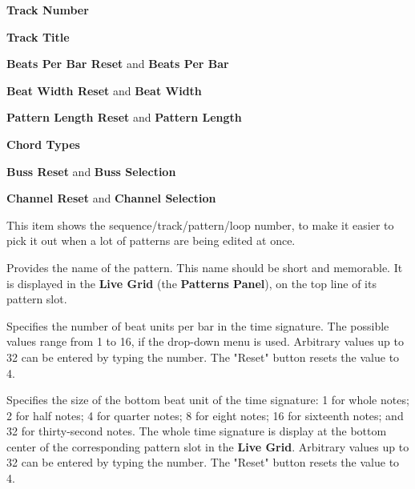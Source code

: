 
   \begin{enumber}
      \item \textbf{Track Number}
      \item \textbf{Track Title}
      \item \textbf{Beats Per Bar Reset} and \textbf{Beats Per Bar}
      \item \textbf{Beat Width Reset} and \textbf{Beat Width}
      \item \textbf{Pattern Length Reset} and \textbf{Pattern Length}
      \item \textbf{Chord Types}
      \item \textbf{Buss Reset} and \textbf{Buss Selection}
      \item \textbf{Channel Reset} and \textbf{Channel Selection}
   \end{enumber}

   \setcounter{ItemCounter}{0}      %

   This item shows the sequence/track/pattern/loop
   number, to make it easier to pick it out when a lot of patterns are being
   edited at once.

   Provides the name of the pattern.
   This name should be short and memorable.
   It is displayed in the \textbf{Live Grid} (the \textbf{Patterns Panel}),
   on the top line of its pattern slot.

   Specifies the number of beat units per bar in the time signature.
   The possible values range from 1 to 16, if the drop-down menu is used.
   Arbitrary values up to 32 can be entered by typing the number.
   The "Reset" button resets the value to 4.


   Specifies the size of the bottom beat unit of the time signature:
   1 for whole notes; 2 for half notes; 4 for quarter notes; 8 for eight notes;
   16 for sixteenth notes; and 32 for thirty-second notes.
   The whole time signature is display at the bottom center of the
   corresponding pattern slot in the \textbf{Live Grid}.
   Arbitrary values up to 32 can be entered by typing the number.
   The "Reset" button resets the value to 4.

